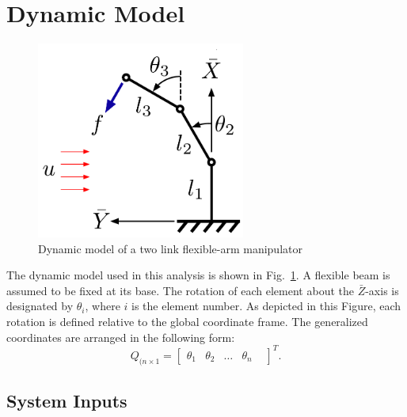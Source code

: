 \documentclass[letterpaper,10pt,conference]{ieeeconf}   %
\begin{document}
\section{Dynamic Model}
\label{sec:intro}
%
\begin{figure}[t!] 
\begin{center}
\includegraphics[width = 2.7in]{Figures/Planar_Model} 
\caption{Dynamic model of a two link flexible-arm manipulator} 
\label{fig:model}
\end{center}
\vspace{0.1in}
\end{figure}
%
The dynamic model used in this analysis is shown in Fig.~\ref{fig:model}. A flexible beam is assumed to be fixed at its base. The rotation of each element about the $\bar{Z}$-axis is designated by $\theta_{i}$, where $i$ is the element number. As depicted in this Figure, each rotation is defined relative to the global coordinate frame. The generalized coordinates are arranged in the following form:
%
\begin{equation}
\label{eq:nodaldisp}
Q_{(n \times 1} = 
\begin{bmatrix}
 \theta_{1} & 
 \theta_{2} &
 \dots & 
 \theta_{n} & 
\end{bmatrix}^T.
\end{equation}
%

\subsection{System Inputs}
\label{sec:inputs}
\end{document}
